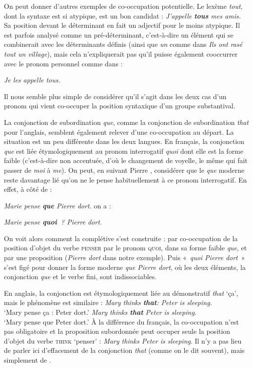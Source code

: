 {    On peut donner d’autres exemples de co-occupation potentielle. Le lexème \textit{tout}, dont la syntaxe est si atypique, est un bon candidat :
    \ea
    \textit{{J’appelle \textbf{tous} mes amis.}}
    \z
    Sa position devant le déterminant en fait un adjectif pour le moins atypique. Il est parfois analysé comme un pré-déterminant, c’est-à-dire un élément qui se combinerait avec les déterminants définis (ainsi que \textit{un} comme dans \textit{Ils ont rasé tout un village}), mais cela n’expliquerait pas qu’il puisse également cooccurrer avec le pronom personnel comme dans :

\ea\textit{{Je les appelle tous.}}
    \z

    Il nous semble plus simple de considérer qu’il s’agit dans les deux cas d’un pronom qui vient co-occuper la position syntaxique d’un groupe substantival.

    La conjonction de subordination \textit{que}, comme la conjonction de subordination \textit{that} pour l’anglais, semblent également relever d’une co-occupation au départ. La situation est un peu différente dans les deux langues. En français, la conjonction \textit{que} est liée étymologiquement au pronom interrogatif \textit{quoi} dont elle est la forme faible (c’est-à-dire non accentuée, d’où le changement de voyelle, le même qui fait passer de \textit{moi} à \textit{me}). On peut, en suivant Pierre \citet{legoffic1993grammaire}, considérer que le \textit{que} moderne reste davantage lié qu’on ne le pense habituellement à ce pronom interrogatif. En effet, à côté de :

    \ea
    \textit{{Marie pense} \textbf{{que}}  {Pierre dort.}}
    \z
    on a :

    \ea
    \textit{{Marie pense} \textbf{{quoi~}}?  {Pierre dort.}}
    \z

    On voit alors comment la complétive s’est construite : par co-occupation de la position d’objet du verbe \textsc{penser} par le pronom \textsc{quoi}, dans sa forme faible \textit{que}, et par une proposition (\textit{Pierre dort} dans notre exemple). Puis «~\textit{quoi Pierre dort}~» s’est figé pour donner la forme moderne \textit{que Pierre dort}, où les deux éléments, la conjonction \textit{que} et le verbe fini, sont indissociables. 
    
    En anglais, la conjonction est étymologiquement liée au démonstratif \textit{that} ‘ça’, mais le phénomène est similaire :
    \ea
    \textit{{Mary thinks} \textbf{{that}}{:}  {Peter is sleeping.} }\\   ‘Mary pense ça : Peter dort.’
    \z
    \ea
    \textit{{Mary thinks} \textbf{{that}}  {Peter is sleeping}.}\\    ‘Mary pense que Peter dort.’
    \z
    À la différence du français, la co-occupation n’est pas obligatoire et la proposition subordonnée peut occuper seule la position d’objet du verbe \textsc{think} ‘penser’ : \textit{Mary thinks Peter is sleeping}. Il n’y a pas lieu de parler ici d’effacement de la conjonction \textit{that} (comme on le dit souvent), mais simplement de .

}
